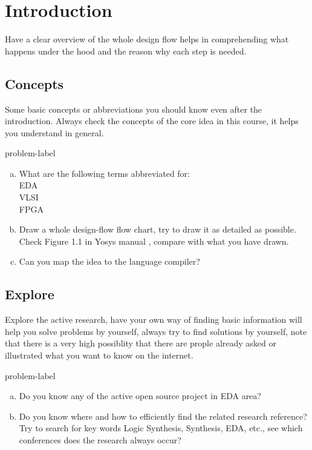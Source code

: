 \documentclass[main.tex]{subfiles}
\begin{document}
\section{Introduction}
Have a clear overview of the whole design flow helps in comprehending what happens under the hood and the reason why each step is needed.

\subsection{Concepts}
Some basic concepts or abbreviations you should know even after the introduction. Always check the concepts of the core idea in this course, it helps you understand in general.
\begin{problem}{}{problem-label}
\begin{enumerate}[(a)]
    \item What are the following terms abbreviated for:\\
    EDA\\
    VLSI\\
    FPGA
    \item Draw a whole design-flow flow chart, try to draw it as detailed as possible.\\
    Check Figure 1.1 in Yosys manual \cite{Yosys}, compare with what you have drawn.
    \item Can you map the idea to the language compiler?
\end{enumerate}
\end{problem}
\vspace*{4\baselineskip}

\subsection{Explore}
Explore the active research, have your own way of finding basic information will help you solve problems by yourself, always try to find solutions by yourself, note that there is a very high possiblity that there are prople already asked or illustrated what you want to know on the internet.
\begin{problem}{}{problem-label}
\begin{enumerate}[(a)]
    \item Do you know any of the active open source project in EDA area?
    \item Do you know where and how to efficiently find the related research reference? Try to search for key words Logic Synthesis, Synthesis, EDA, etc., see which conferences does the research always occur?
\end{enumerate}
\end{problem}
\vspace*{4\baselineskip}
\end{document}
